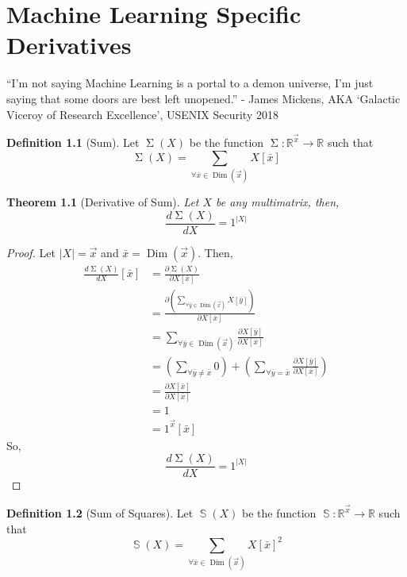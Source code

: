 \documentclass[12pt]{book}
\theoremstyle{plain}
\newtheorem{theorem}{Theorem}[chapter]
\theoremstyle{definition}
\newtheorem{definition}{Definition}[chapter]
\theoremstyle{ppart}
\theoremstyle{case}
\theoremstyle{solution}
\DeclareMathOperator{\Dim}{Dim}
\DeclareMathOperator{\SoS}{\mathbb{S}}
\DeclareMathOperator{\Sum}{\Sigma}
\newcommand{\shape}[1]{\left|#1\right|}
\begin{document}
\chapter{Machine Learning Specific Derivatives}

\begin{displayquote}
``I'm not saying Machine Learning is a portal to a demon universe, I'm just saying
that some doors are best left unopened.'' - James Mickens, AKA `Galactic Viceroy of Research Excellence', USENIX Security 2018
\end{displayquote}

\begin{definition}[Sum]
Let $\Sum(X)$ be the function $\Sum : \mathbb{R}^{\vec{x}} \to \mathbb{R}$
such that \[ \Sum(X) = \sum_{\forall \bar{x} \in \Dim(\vec{x})} X[\bar{x}] \]
\end{definition}

\begin{theorem}[Derivative of Sum]
Let $X$ be any multimatrix, then,
\[\frac{d\Sum(X)}{dX} = 1^{\shape{X}}\]
\end{theorem}
\begin{proof}
Let $\shape{X} = \vec{x}$ and $\bar{x} = \Dim(\vec{x})$. Then,
\begin{align*}
  \frac{d\Sum(X)}{dX}[\bar{x}]
  &= \frac{\partial \Sum(X)}{\partial X[\bar{x}]} \\
  &= \frac{
    \partial \left(
      \sum_{\forall \bar{y} \in \Dim(\vec{x})} X[\bar{y}]
    \right)
  }{
    \partial X[\bar{x}]
  } \\
  &= \sum_{\forall \bar{y} \in \Dim(\vec{x})}
  \frac{
    \partial X[\bar{y}]
  }{
    \partial X[\bar{x}]
  } \\
  &= \left(
    \sum_{\forall \bar{y} \ne \bar{x}} 0
  \right)
  +
  \left(
    \sum_{\forall \bar{y} = \bar{x}}
    \frac{\partial X[\bar{y}]}{\partial X[\bar{x}]}
  \right) \\
  &= \frac{\partial X[\bar{x}]}{\partial X[\bar{x}]} \\
  &= 1 \\
  &= 1^{\vec{x}}[\bar{x}]
\end{align*}
So,
\[\frac{d\Sum(X)}{dX} = 1^{\shape{X}}\]
\end{proof}

\begin{definition}[Sum of Squares]
Let $\SoS(X)$ be the function $\SoS : \mathbb{R}^{\vec{x}} \to \mathbb{R}$
such that 
\[ \SoS(X) = \sum_{\forall \bar{x} \in \Dim(\vec{x})} X[\bar{x}]^2 \]
\end{definition}
\end{document}
